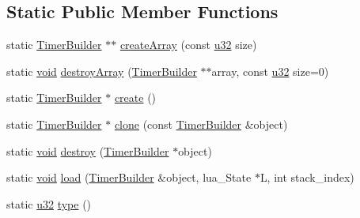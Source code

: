 \subsection*{Static Public Member Functions}
\begin{DoxyCompactItemize}
\item 
static \mbox{\hyperlink{classnjli_1_1_timer_builder}{Timer\+Builder}} $\ast$$\ast$ \mbox{\hyperlink{classnjli_1_1_timer_builder_a716e86de4e5e8be3e464bd39ed625da3}{create\+Array}} (const \mbox{\hyperlink{_util_8h_a10e94b422ef0c20dcdec20d31a1f5049}{u32}} size)
\item 
static \mbox{\hyperlink{_thread_8h_af1e856da2e658414cb2456cb6f7ebc66}{void}} \mbox{\hyperlink{classnjli_1_1_timer_builder_a51422a93b6453f976ed1aecc64aaf11d}{destroy\+Array}} (\mbox{\hyperlink{classnjli_1_1_timer_builder}{Timer\+Builder}} $\ast$$\ast$array, const \mbox{\hyperlink{_util_8h_a10e94b422ef0c20dcdec20d31a1f5049}{u32}} size=0)
\item 
static \mbox{\hyperlink{classnjli_1_1_timer_builder}{Timer\+Builder}} $\ast$ \mbox{\hyperlink{classnjli_1_1_timer_builder_aa867a59bcb49a6af4a26b4f384a01f20}{create}} ()
\item 
static \mbox{\hyperlink{classnjli_1_1_timer_builder}{Timer\+Builder}} $\ast$ \mbox{\hyperlink{classnjli_1_1_timer_builder_a9277607c63adf64e917626ff30aaf3ac}{clone}} (const \mbox{\hyperlink{classnjli_1_1_timer_builder}{Timer\+Builder}} \&object)
\item 
static \mbox{\hyperlink{_thread_8h_af1e856da2e658414cb2456cb6f7ebc66}{void}} \mbox{\hyperlink{classnjli_1_1_timer_builder_a3602b82600cf60b9ef389ecc77e9ec93}{destroy}} (\mbox{\hyperlink{classnjli_1_1_timer_builder}{Timer\+Builder}} $\ast$object)
\item 
static \mbox{\hyperlink{_thread_8h_af1e856da2e658414cb2456cb6f7ebc66}{void}} \mbox{\hyperlink{classnjli_1_1_timer_builder_a7570d49424feec501a456a19cfdbe827}{load}} (\mbox{\hyperlink{classnjli_1_1_timer_builder}{Timer\+Builder}} \&object, lua\+\_\+\+State $\ast$L, int stack\+\_\+index)
\item 
static \mbox{\hyperlink{_util_8h_a10e94b422ef0c20dcdec20d31a1f5049}{u32}} \mbox{\hyperlink{classnjli_1_1_timer_builder_a13a97322d239136b0302a73a92d4ef01}{type}} ()
\end{DoxyCompactItemize}
